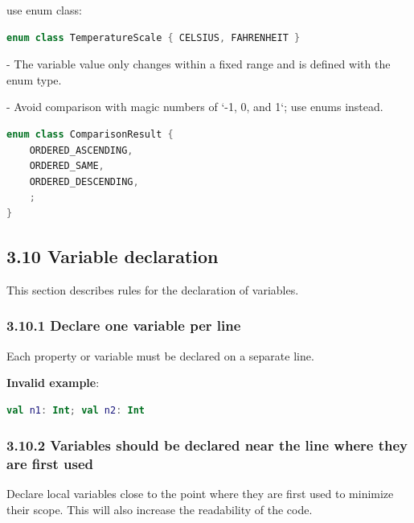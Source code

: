 {{{{use enum class:



\begin{lstlisting}[language=Kotlin]
enum class TemperatureScale { CELSIUS, FAHRENHEIT }
\end{lstlisting}


- The variable value only changes within a fixed range and is defined with the enum type. 

- Avoid comparison with magic numbers of `-1, 0, and 1`; use enums instead.



\begin{lstlisting}[language=Kotlin]
enum class ComparisonResult {
    ORDERED_ASCENDING,
    ORDERED_SAME,
    ORDERED_DESCENDING,
    ;
}
\end{lstlisting}


\subsection*{\textbf{3.10 Variable declaration}}

\label{sec:3.10}

This section describes rules for the declaration of variables.

\subsubsection*{\textbf{3.10.1 Declare one variable per line}}
\leavevmode\newline

\label{sec:3.10.1}



Each property or variable must be declared on a separate line. 



\textbf{Invalid example}:

\begin{lstlisting}[language=Kotlin]
val n1: Int; val n2: Int
\end{lstlisting}


\subsubsection*{\textbf{3.10.2 Variables should be declared near the line where they are first used}}
\leavevmode\newline

\label{sec:3.10.2}

Declare local variables close to the point where they are first used to minimize their scope. This will also increase the readability of the code.

}}}}

